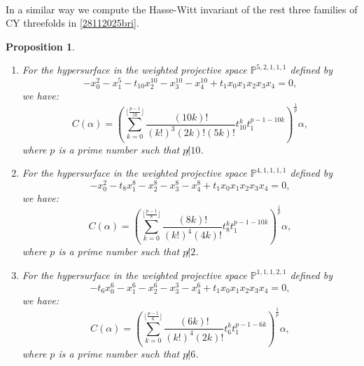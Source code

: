 \documentclass[11pt,leqno]{article}
\newtheorem{prop}{Proposition}
\theoremstyle{remark}
\theoremstyle{definition}
\begin{document}
\begin{table}
\begin{equation*}
\begin{array}{|c|l|}
\end{array}
\end{equation*}
\caption{ $A_p(x,y)$ of mirror quintic at small primes $p$.}
\label{table: A_p(x,y) of mirror quintic at small primes}
\end{table}


In a similar way we compute the Hasse-Witt invariant of the rest three families of CY threefolds in \cref{28112025bri}. %


\begin{prop} 
\begin{enumerate}
    \item 
For the hypersurface in the weighted projective space $\mathbb{P}^{5,2,1,1,1}$ defined by
\[
-x_0^2 - x_1^5 - t_{10}x_2^{10} - x_3^{10} - x_4^{10} +t_1 x_0x_1x_2x_3x_4 = 0,
\]
we have:
\begin{equation}
C(\alpha) = \left( \sum_{k=0}^{\lfloor \frac{p-1}{10} \rfloor} \frac{(10k)!}{(k!)^3(2k)!(5k)!}t_{10}^k t_1^{p-1-10k} \right)^{\frac{1}{p}} \alpha,
\end{equation}
where $p$ is a prime number such that $p\not|10$.
\item
For the hypersurface in the weighted projective space $\mathbb{P}^{4,1,1,1,1}$ defined by
\[
-x_0^2 -t_8 x_1^8 - x_2^{8} - x_3^{8} - x_4^{8} +t_1 x_0x_1x_2x_3x_4 = 0,
\]
we have:
\begin{equation}
C(\alpha) = \left( \sum_{k=0}^{\lfloor \frac{p-1}{8} \rfloor} \frac{(8k)!}{(k!)^4(4k)!}t_{8}^k t_1^{p-1-10k} \right)^{\frac{1}{p}} \alpha,
\end{equation}
where $p$ is a prime number such that $p\not| 2$.
\item 
For the hypersurface in the weighted projective space $\mathbb{P}^{1,1,1,2,1}  $ defined by
\[
-t_6x_0^6 - x_1^6 - x_2^{6} - x_3^{3} - x_4^{6} +t_1 x_0x_1x_2x_3x_4 = 0,
\]
we have:
\begin{equation}
C(\alpha) = \left( \sum_{k=0}^{\lfloor \frac{p-1}{6} \rfloor} \frac{(6k)!}{(k!)^4(2k)!}t_{6}^k t_1^{p-1-6k} \right)^{\frac{1}{p}} \alpha,
\end{equation}
where $p$ is a prime number such that $p\not|6$.
\end{enumerate}
\end{prop}
\end{document}
